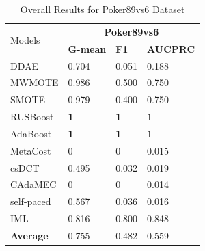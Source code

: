 \begin{table}[h]
    \centering
    \begin{tabular}{|p{}<{\centering}|p{}<{\centering}|p{}<{\centering}|p{}<{\centering}|}
    \hline
    \multirow{2}{*}{Models} & \multicolumn{3}{c|}{\textbf{Poker89vs6}}    \\ \cline{2-4} 
                             & \textbf{G-mean} & \textbf{F1} & \textbf{AUCPRC} \\ \hline
    DDAE                     &0.704	&0.051	&0.188             \\ \hline
    MWMOTE                   &0.986	&0.500	&0.750             \\ \hline
    SMOTE                    &0.979	&0.400	&0.750               \\ \hline
    RUSBoost                 &\textbf{1}	&\textbf{1}	&\textbf{1}             \\ \hline
    AdaBoost                 & \textbf{1}	&\textbf{1}	&\textbf{1}             \\ \hline
    MetaCost                 & 0	&0	&0.015             \\ \hline
    csDCT                    &0.495	&0.032	&0.019              \\ \hline
    CAdaMEC                  &   0	&0	&0.014           \\ \hline
    self-paced               & 0.567	&0.036	&0.016              \\ \hline
    IML                      & 0.816	&0.800	&0.848            \\ \hline\hline
    \textbf{Average}         & 0.755	&0.482	&0.559               \\ \hline
    \end{tabular}
    \vspace{-8pt}
    \caption{Overall Results for Poker89vs6 Dataset}
    \label{tab18}
\end{table}
